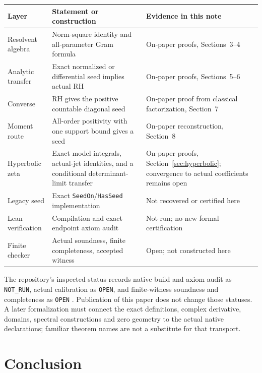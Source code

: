 \documentclass[11pt,a4paper]{article}
\numberwithin{equation}{section}
\theoremstyle{definition}
\theoremstyle{remark}
\begin{document}
\clearpage
\begin{longtable}{@{}>{\raggedright\arraybackslash}p{}>{\raggedright\arraybackslash}p{}>{\raggedright\arraybackslash}p{}@{}}
\toprule
\textbf{Layer}&\textbf{Statement or construction}&\textbf{Evidence in this note}\\
\midrule
\endhead
Resolvent algebra&Norm-square identity and all-parameter Gram formula&On-paper proofs, Sections~3--4\\
\addlinespace
Analytic transfer&Exact normalized or differential seed implies actual RH&On-paper proofs, Sections~5--6\\
\addlinespace
Converse&RH gives the positive countable diagonal seed&On-paper proof from classical factorization, Section~7\\
\addlinespace
Moment route&All-order positivity with one support bound gives a seed&On-paper reconstruction, Section~8\\
\addlinespace
Hyperbolic zeta&Exact model integrals, actual-jet identities, and a conditional determinant-limit transfer&On-paper proofs, Section~\ref{sec:hyperbolic}; convergence to actual coefficients remains open\\
\addlinespace
Legacy seed&Exact \texttt{SeedOn}/\texttt{HasSeed} implementation&Not recovered or certified here\\
\addlinespace
Lean verification&Compilation and exact endpoint axiom audit&Not run; no new formal certification\\
\addlinespace
Finite checker&Actual soundness, finite completeness, accepted witness&Open; not constructed here\\
\bottomrule
\end{longtable}

The repository's inspected status records native build and axiom audit
as \texttt{NOT\_RUN}, actual calibration as \texttt{OPEN}, and
finite-witness soundness and completeness as \texttt{OPEN}
\cite{repo-status}. Publication of this paper does not change those
statuses. A later formalization must connect the exact definitions,
complex derivative, domains, spectral constructions and zero geometry
to the actual native declarations; familiar theorem names are not a
substitute for that transport.

\section{Conclusion}\label{sec:conclusion}
\end{document}

